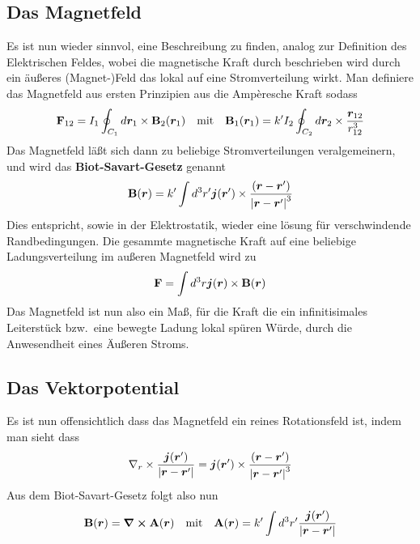 \subsection{Das Magnetfeld}%
\label{sub:magnetfeld}
Es ist nun wieder sinnvol, eine Beschreibung zu finden, analog zur Definition des Elektrischen Feldes, wobei die magnetische Kraft durch beschrieben wird durch ein äußeres (Magnet-)Feld das lokal auf eine Stromverteilung wirkt. Man definiere das Magnetfeld aus ersten Prinzipien
aus die Ampèresche Kraft sodass
\begin{equation}
  \vb F_{12} = I_1\oint_{C_1} d\vb*r_1\times \vb B_2(\vb*r_1)
  \quad\text{mit}\quad
  \vb B_1(\vb*r_1) = k'I_2 \oint_{C_2} d\vb*r_2 \times \frac{\vb*r_{12}}{r^3_{12}} 
\end{equation}
Das Magnetfeld läßt sich dann zu beliebige Stromverteilungen veralgemeinern, und wird das \textbf{Biot-Savart-Gesetz} genannt
\begin{equation}
  \vb B(\vb*r) = k'\int d^3 r' \vb*j(\vb*r')\times\frac{(\vb*r-\vb*r')}{\abs{\vb*r-\vb*r'}^3}
\end{equation}
Dies entspricht, sowie in der Elektrostatik, wieder eine lösung für
verschwindende Randbedingungen.
Die gesammte magnetische Kraft auf eine beliebige Ladungsverteilung im außeren Magnetfeld wird zu
\begin{equation}
  \vb F = \int d^3r \vb*j(\vb*r) \times \vb B(\vb*r)
\end{equation}
Das Magnetfeld ist nun also ein Maß, für die Kraft die ein infinitisimales Leiterstück bzw.\ eine bewegte Ladung lokal spüren Würde, durch die
Anwesendheit eines Äußeren Stroms.

\subsection{Das Vektorpotential}%
\label{sub:Vektorpotential}
Es ist nun offensichtlich dass das Magnetfeld ein reines Rotationsfeld ist,
indem man sieht dass
\begin{equation}
  \vb \nabla_r \times \frac{\vb*j(\vb*r')}{\abs{\vb*r-\vb*r'}} 
  = \vb*j(\vb*r')\times\frac{(\vb*r-\vb*r')}{\abs{\vb*r-\vb*r'}^3} 
\end{equation}
Aus dem Biot-Savart-Gesetz folgt also nun
\begin{equation}
    \label{eq:vektorpotential}
    \vb B(\vb*r) = \curl \vb A(\vb*r)\quad\text{mit}
    \quad\vb A(\vb*r) = k'\int d^3r' \frac{\vb*j(\vb*r')}{\abs{\vb*r-\vb*r'}}
\end{equation} 

